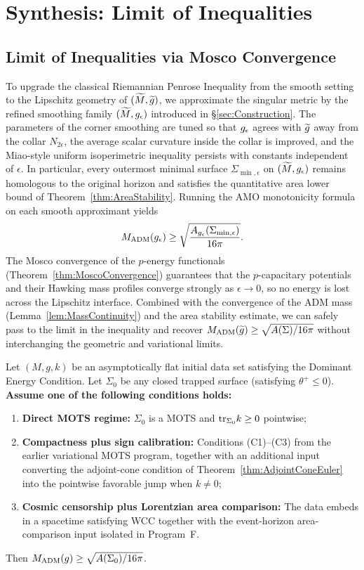\section{Synthesis: Limit of Inequalities}
\label{sec:Synthesis}

\subsection{Limit of Inequalities via Mosco Convergence}
To upgrade the classical Riemannian Penrose Inequality from the smooth setting to the Lipschitz geometry of $(\widetilde{M},\widetilde{g})$, we approximate the singular metric by the refined smoothing family $(\widetilde{M},g_{\epsilon})$ introduced in \S\ref{sec:Construction}. The parameters of the corner smoothing are tuned so that $g_{\epsilon}$ agrees with $\widetilde{g}$ away from the collar $N_{2\epsilon}$, the average scalar curvature inside the collar is improved, and the Miao-style uniform isoperimetric inequality persists with constants independent of $\epsilon$. In particular, every outermost minimal surface $\Sigma_{\min,\epsilon}$ on $(\widetilde{M},g_{\epsilon})$ remains homologous to the original horizon and satisfies the quantitative area lower bound of Theorem~\ref{thm:AreaStability}. Running the AMO monotonicity formula on each smooth approximant yields
\[
    M_{\mathrm{ADM}}(g_{\epsilon}) \ge \sqrt{\frac{A_{g_{\epsilon}}(\Sigma_{\min,\epsilon})}{16\pi}}.
\]
The Mosco convergence of the $p$-energy functionals (Theorem~\ref{thm:MoscoConvergence}) guarantees that the $p$-capacitary potentials and their Hawking mass profiles converge strongly as $\epsilon \to 0$, so no energy is lost across the Lipschitz interface. Combined with the convergence of the ADM mass (Lemma~\ref{lem:MassContinuity}) and the area stability estimate, we can safely pass to the limit in the inequality and recover $M_{\mathrm{ADM}}(\widetilde{g}) \ge \sqrt{A(\Sigma)/16\pi}$ without interchanging the geometric and variational limits.

\begin{theorem}
Let $(M, g, k)$ be an asymptotically flat initial data set satisfying the Dominant Energy Condition. Let $\Sigma_0$ be any closed trapped surface (satisfying $\theta^+ \le 0$). 
\textbf{Assume one of the following conditions holds:}
\begin{enumerate}
    \item \textbf{Direct MOTS regime:} $\Sigma_0$ is a MOTS and $\mathrm{tr}_{\Sigma_0} k \ge 0$ pointwise;
    \item \textbf{Compactness plus sign calibration:} Conditions (C1)--(C3) from the earlier variational MOTS program, together with an additional input converting the adjoint-cone condition of Theorem~\ref{thm:AdjointConeEuler} into the pointwise favorable jump when $k\neq0$;
    \item \textbf{Cosmic censorship plus Lorentzian area comparison:} The data embeds in a spacetime satisfying WCC together with the event-horizon area-comparison input isolated in Program~F.
\end{enumerate}
Then $M_{\mathrm{ADM}}(g) \ge \sqrt{A(\Sigma_0)/16\pi}$.
\end{theorem}

